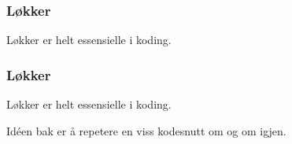 
\begin{frame}
    \frametitle{Løkker}

    Løkker er helt essensielle i koding. 

\end{frame}

\begin{frame}
    \frametitle{Løkker}

    Løkker er helt essensielle i koding. 

    Idéen bak er å repetere en viss kodesnutt om og om igjen.

\end{frame}

